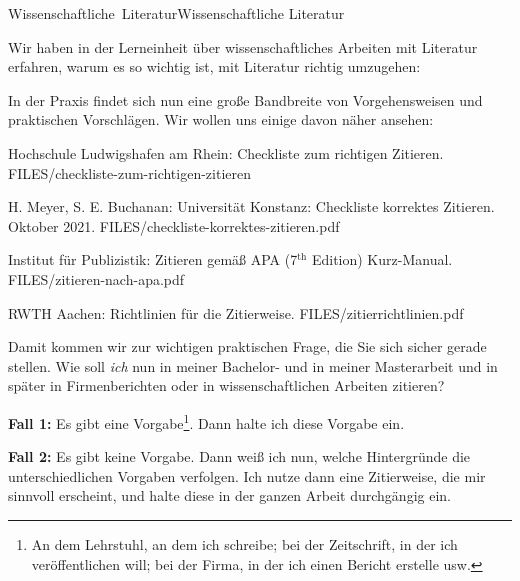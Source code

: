 

\unit{Wissenschaftliche Literatur}{Wissenschaftliche Literatur}

Wir haben in der Lerneinheit über wissenschaftliches Arbeiten mit Literatur erfahren, warum es so wichtig
ist, mit Literatur richtig umzugehen: 

In der Praxis findet sich nun eine große Bandbreite von Vorgehensweisen und praktischen Vorschlägen.
Wir wollen uns einige davon näher ansehen:

{Hochschule Ludwigshafen am Rhein: Checkliste zum richtigen Zitieren.}
{FILES/checkliste-zum-richtigen-zitieren}
{\href{https://www.hwg-lu.de/fileadmin/user_upload/service/studium-und-lehre/Schreiblabor/Checkliste_zum_richtigen_Zitieren.pdf}{\online}}

{H. Meyer, S. E. Buchanan: Universität Konstanz: Checkliste korrektes Zitieren.
Oktober 2021.}
{FILES/checkliste-korrektes-zitieren.pdf}
{\href{https://www.uni-konstanz.de/typo3temp/secure_downloads/56005/0/aa6c4978a124f4750b3f880768fa67be473965e6/Checkliste_Korrektes_Zitieren.pdf}{\online}}

{Institut für Publizistik: Zitieren gemäß APA (7$^{\mbox{th}}$ Edition) Kurz-Manual.}
{FILES/zitieren-nach-apa.pdf}
{\href{https://www.studium.ifp.uni-mainz.de/files/2020/12/APA7_Kurz-Manual.pdf}{\online}}

{RWTH Aachen: Richtlinien für die Zitierweise.}
{FILES/zitierrichtlinien.pdf}
{\href{https://embedded.rwth-aachen.de/lib/exe/fetch.php?media=lehre:zitierrichtlinien.pdf}{\online}}

Damit kommen wir zur wichtigen praktischen Frage, die Sie sich sicher gerade stellen.
Wie soll \textit{ich} nun in meiner Bachelor- und in meiner Masterarbeit und in später in Firmenberichten
oder in wissenschaftlichen Arbeiten zitieren?

\textbf{Fall 1:} Es gibt eine Vorgabe\footnote{An dem Lehrstuhl, an dem ich schreibe; bei der Zeitschrift, in der ich veröffentlichen
will; bei der Firma, in der ich einen Bericht erstelle usw.}. Dann halte ich diese Vorgabe ein.

\textbf{Fall 2:} Es gibt keine Vorgabe. Dann weiß ich nun, welche Hintergründe die unterschiedlichen Vorgaben
verfolgen. Ich nutze dann eine Zitierweise, die mir sinnvoll erscheint, und halte diese in der ganzen Arbeit
durchgängig ein.

